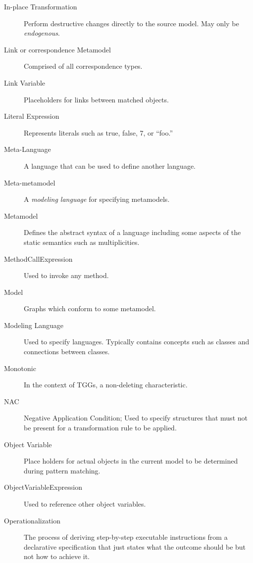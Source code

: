 \begin{description}
\item[In-place Transformation] Perform destructive changes directly to the source model. May only be \emph{endogenous}.

\item[Link or correspondence Metamodel] 
Comprised of all correspondence types.

\item[Link Variable]
Placeholders for links between matched objects.

\item[Literal Expression]
Represents literals such as true, false, 7, or ``foo.''

\item[Meta-Language] 
A language that can be used to define another language.

\item[Meta-metamodel] 
A \emph{modeling language} for specifying metamodels.

\item[Metamodel] 
Defines the abstract syntax of a language including some aspects of the static semantics such as multiplicities. 

\item[MethodCallExpression]
Used to invoke any method.

\item[Model] 
Graphs which conform to some metamodel.

\item[Modeling Language] 
Used to specify languages. Typically contains concepts such as classes and connections between classes.

\item[Monotonic] 
In the context of TGGs, a non-deleting characteristic.

\item[NAC]
Negative Application Condition; Used to specify structures that must not be present for a transformation rule to be applied.

\item[Object Variable]
Place holders for actual objects in the current model to be determined during pattern matching.

\item[ObjectVariableExpression]
Used to reference other object variables.

\item[Operationalization] 
The process of deriving step-by-step executable instructions from a declarative specification that just states what the outcome should
be but not how to achieve it.


\end{description}
